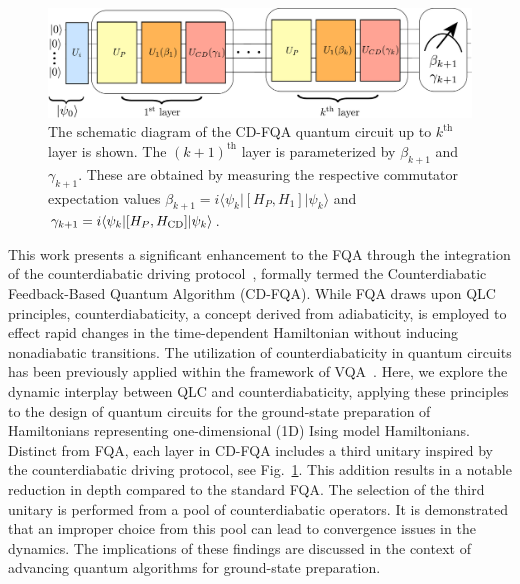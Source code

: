 \documentclass[twocolumn,aps,superscriptaddress,floatfix,longbibliography]{revtex4-2}
\begin{document}
\begin{figure}
\centering
\includegraphics[scale=0.4]{Circuit.pdf}
\caption{
   The schematic diagram of the CD-FQA quantum circuit up to
   $k^{\text{th}}$ layer is shown. The  $(k+1)^{\text{th}}$
   layer is parameterized by $\beta_{k+1}$ and $\gamma_{k+1}$.
   These are obtained by measuring the respective 
   commutator expectation values %
   $\beta_{k+1} = i\langle \psi_{k}|[H_{P}, H_{1} ]|\psi_{k}\rangle$ and
   $\gamma_{k+1} = i\langle \psi_{k}|[H_{P}, H_{\rm CD}]|\psi_{k}\rangle$.}
\label{fig:1}
\end{figure}

This work presents a significant enhancement to the FQA through
the integration of the counterdiabatic driving
protocol~\cite{demirplak2003adiabatic}, formally termed the
Counterdiabatic Feedback-Based Quantum Algorithm (CD-FQA). While
FQA draws upon QLC principles, counterdiabaticity, a concept
derived from adiabaticity, is employed to effect rapid changes
in the time-dependent Hamiltonian without inducing nonadiabatic
transitions. The utilization of counterdiabaticity in quantum
circuits has been previously applied within the framework of VQA~\cite{yao2021reinforcement,chandarana2022digitized,keever2023adiabatic}. Here, we
explore the dynamic interplay between QLC and
counterdiabaticity, applying these principles to the design of
quantum circuits for the ground-state preparation of
Hamiltonians representing one-dimensional (1D) Ising model
Hamiltonians. Distinct from FQA, each layer in CD-FQA includes a
third unitary inspired by the counterdiabatic driving protocol, see Fig.~\ref{fig:1}.
This addition results in a notable reduction in depth compared
to the standard FQA. The selection of the third unitary is
performed from a pool of counterdiabatic operators. It is
demonstrated that an improper choice from this pool can lead to
convergence issues in the dynamics. The implications of these
findings are discussed in the context of advancing quantum
algorithms for ground-state preparation.
\end{document}
